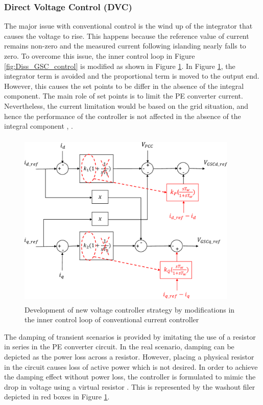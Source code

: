 \subsubsection{Direct Voltage Control (DVC)}\label{DVC_theory}
The major issue with conventional control is the wind up of the integrator that causes the voltage to rise. This happens because the reference value of current remains non-zero and the measured current following islanding nearly falls to zero. To overcome this issue, the inner control loop in Figure \ref{fig:Diss_GSC_control} is modified as shown in Figure \ref{fig:Diss_DVC_control}. In Figure \ref{fig:Diss_DVC_control}, the integrator term is avoided and the proportional term is moved to the output end. However, this causes the set points to be differ in the absence of the integral component. The main role of set points is to limit the \gls{PE} converter current. Nevertheless, the current limitation would be based on the grid situation, and hence the performance of the controller is not affected in the absence of the integral component \cite{korai_dynamic_2019}, \cite{erlich_new_2017}.       

\begin{figure}[H]
\centering
    \includegraphics[height = 8.5cm,width = 10.5cm]{Diagrams/Chapter_2/Inner_control_GSC_chap2_2.pdf}
    \caption{ Development of new voltage controller strategy by modifications in the inner control loop of conventional current controller \cite{erlich_new_2017}}
    \label{fig:Diss_DVC_control}
\end{figure}

The damping of transient scenarios is provided by imitating the use of a resistor in series in the \gls{PE} converter circuit. In the real scenario, damping can be depicted as the power loss across a resistor. However, placing a physical resistor in the circuit causes loss of active power which is not desired. In order to achieve the damping effect without power loss, the controller is formulated to mimic the drop in voltage using a virtual resistor \cite{erlich_new_2017}. This is represented by the washout filer depicted in red boxes in Figure \ref{fig:Diss_DVC_control}.

